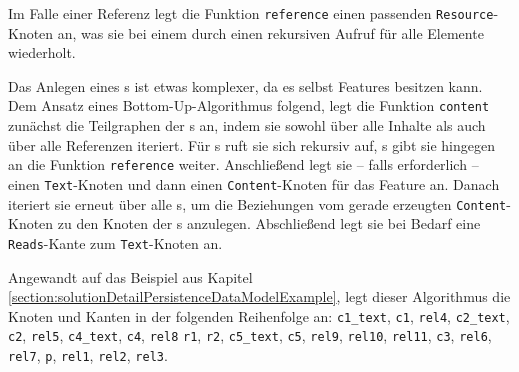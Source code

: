     

    Im Falle einer Referenz legt die Funktion \texttt{reference} einen passenden \texttt{Resource}-Knoten an,   
    was sie bei einem {\collectionFeature} durch einen rekursiven Aufruf für alle Elemente wiederholt.
    
    Das Anlegen eines {\contentFeature}s ist etwas komplexer,
    da es selbst Features besitzen kann.
    Dem Ansatz eines Bottom-Up-Algorithmus folgend, legt die Funktion \texttt{content}
    zunächst die Teilgraphen der {\childFeature}s an,
    indem sie sowohl über alle Inhalte als auch über alle Referenzen iteriert.
    Für {\contentFeature}s ruft sie sich rekursiv auf,
    {}s gibt sie hingegen an die Funktion \texttt{reference} weiter.
    Anschließend legt sie -- falls erforderlich -- einen \texttt{Text}-Knoten und dann einen \texttt{Content}-Knoten
    für das Feature an.
    Danach iteriert sie erneut über alle {\childFeature}s, um die Beziehungen vom
    gerade erzeugten \texttt{Content}-Knoten zu den Knoten der {\childFeature}s anzulegen.
    Abschließend legt sie bei Bedarf eine \texttt{Reads}-Kante zum \texttt{Text}-Knoten an.

    Angewandt auf das Beispiel aus Kapitel \ref{section:solutionDetailPersistenceDataModelExample},
    legt dieser Algorithmus die Knoten und Kanten in der folgenden Reihenfolge an:
    \texttt{c1\_text}, \texttt{c1}, \texttt{rel4},
    \texttt{c2\_text}, \texttt{c2}, \texttt{rel5},
    \texttt{c4\_text}, \texttt{c4}, \texttt{rel8}
    \texttt{r1}, \texttt{r2}, \texttt{c5\_text}, \texttt{c5},
    \texttt{rel9}, \texttt{rel10}, \texttt{rel11},
    \texttt{c3}, \texttt{rel6}, \texttt{rel7},
    \texttt{p}, \texttt{rel1}, \texttt{rel2}, \texttt{rel3}.